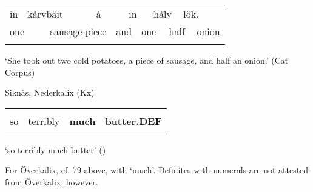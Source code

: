 \begin{tabular}{llllllllllll}
\lsptoprule
in & \multicolumn{2}{l}{kårvbäit

} & \multicolumn{2}{l}{å

} & \multicolumn{2}{l}{in

} & \multicolumn{2}{l}{hålv

} & \multicolumn{2}{l}{lök.

} & \\
\multicolumn{2}{l}{one

} & \multicolumn{2}{l}{sausage-piece

} & \multicolumn{2}{l}{and

} & \multicolumn{2}{l}{one

} & \multicolumn{2}{l}{half

} & \multicolumn{2}{l}{onion

}\\
\lspbottomrule
\end{tabular}

\begin{styleTranslation}
‘She took out two cold potatoes, a piece of sausage, and half an onion.’ (Cat Corpus)

\end{styleTranslation}


\begin{listWWNumileveli}
\item {}

\begin{styleExample}
Siknäs, Nederkalix (Kx)

\end{styleExample}

\end{listWWNumileveli}

\begin{tabular}{llll}
\lsptoprule
\multicolumn{4}{l}{så

}\\
so & terribly & {\bfseries much} & {\bfseries butter.DEF}\\
\lspbottomrule
\end{tabular}

\begin{styleTranslation}
‘so terribly much butter’ (\citet{Stenberg1971})

\end{styleTranslation}

\begin{styleBodyTextFirst}
For Överkalix, cf. 79 above, with ‘much’. Definites with numerals are not attested from Överkalix, however.

\end{styleBodyTextFirst}

